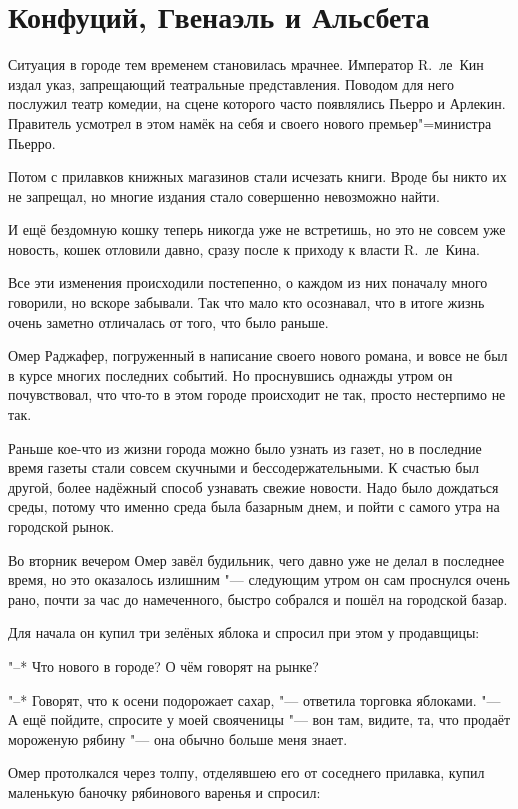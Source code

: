 \section{Конфуций, Гвенаэль и Альсбета}

Ситуация в городе тем временем становилась мрачнее.
Император R.~ле~Кин издал указ, запрещающий театральные представления.
Поводом для него послужил театр комедии, на сцене которого часто появлялись
Пьерро и Арлекин.
Правитель усмотрел в этом намёк на себя и своего нового премьер"=министра
Пьерро.

Потом с прилавков книжных магазинов стали исчезать книги.
Вроде бы никто их не запрещал, но многие издания стало совершенно невозможно
найти.

И ещё бездомную кошку теперь никогда уже не встретишь, но это не совсем уже
новость, кошек отловили давно, сразу после к приходу к власти R.~ле~Кина.

Все эти изменения происходили постепенно, о каждом из них поначалу много
говорили, но вскоре забывали.
Так что мало кто осознавал, что в итоге жизнь очень заметно отличалась от того,
что было раньше.

Омер Раджафер, погруженный в написание своего нового романа, и вовсе не был в
курсе многих последних событий.
Но проснувшись однажды утром он почувствовал, что что-то в этом городе
происходит не так, просто нестерпимо не так.

Раньше кое-что из жизни города можно было узнать из газет, но в последние время
газеты стали совсем скучными и бессодержательными.
К счастью был другой, более надёжный способ узнавать свежие новости.
Надо было дождаться среды, потому что именно среда была базарным днем, и пойти с
самого утра на городской рынок.

Во вторник вечером Омер завёл будильник, чего давно уже не делал в последнее
время, но это оказалось излишним "--- следующим утром он сам проснулся очень
рано, почти за час до намеченного, быстро собрался и пошёл на городской базар.

Для начала он купил три зелёных яблока и спросил при этом у продавщицы:

"--* Что нового в городе?
О чём говорят на рынке?

"--* Говорят, что к осени подорожает сахар, "--- ответила торговка яблоками.
"--- А ещё пойдите, спросите у моей свояченицы "--- вон там, видите, та, что
продаёт мороженую рябину "--- она обычно больше меня знает.

Омер протолкался через толпу, отделявшею его от соседнего прилавка, купил
маленькую баночку рябинового варенья и спросил:

